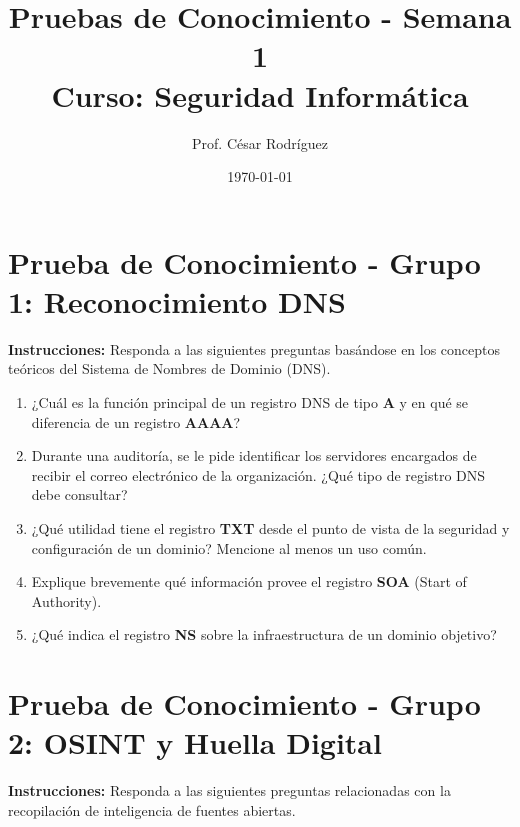 \documentclass[12pt,a4paper]{article}
\title{Pruebas de Conocimiento - Semana 1 \\ \large Curso: Seguridad Informática}
\author{Prof. César Rodríguez}
\date{\today}
\begin{document}
\maketitle

\tableofcontents
\newpage


\section{Prueba de Conocimiento - Grupo 1: Reconocimiento DNS}
\textbf{Instrucciones:} Responda a las siguientes preguntas basándose en los conceptos teóricos del Sistema de Nombres de Dominio (DNS).

\begin{enumerate}[label=\textbf{\arabic*.}]
    \item ¿Cuál es la función principal de un registro DNS de tipo \textbf{A} y en qué se diferencia de un registro \textbf{AAAA}?
    \item Durante una auditoría, se le pide identificar los servidores encargados de recibir el correo electrónico de la organización. ¿Qué tipo de registro DNS debe consultar?
    \item ¿Qué utilidad tiene el registro \textbf{TXT} desde el punto de vista de la seguridad y configuración de un dominio? Mencione al menos un uso común.
    \item Explique brevemente qué información provee el registro \textbf{SOA} (Start of Authority).
    \item ¿Qué indica el registro \textbf{NS} sobre la infraestructura de un dominio objetivo?
\end{enumerate}

\vspace{1cm}

\section{Prueba de Conocimiento - Grupo 2: OSINT y Huella Digital}
\textbf{Instrucciones:} Responda a las siguientes preguntas relacionadas con la recopilación de inteligencia de fuentes abiertas.
\end{document}
